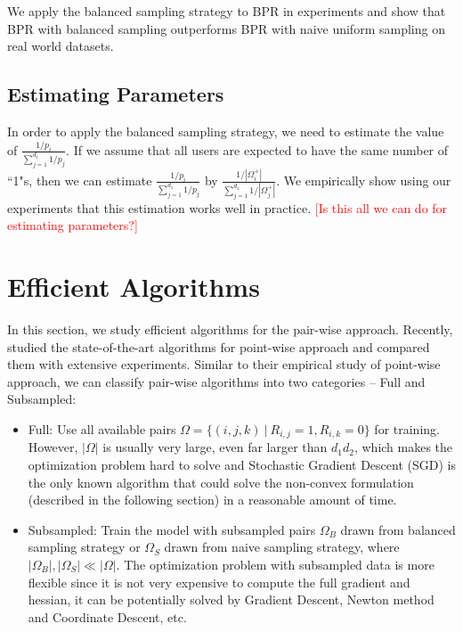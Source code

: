 \documentclass[conference]{IEEEtran}
\numberwithin{equation}{section}
\newcommand{\LL}[1]{\textcolor{red}{[#1]}}
\newtheorem{sampling strategy}{Sampling Strategy}
\begin{document}
We apply the balanced sampling strategy to BPR in experiments and show that BPR with balanced sampling outperforms BPR with naive uniform sampling on real world datasets.

\subsection{Estimating Parameters}
\label{sec:estimate}

In order to apply the balanced sampling strategy, we need to estimate the value of $\frac{1/p_i}{\sum_{j=1}^{d_1} 1/p_j}$. If we assume that all users are expected to have the same number of ``1"s, then we can estimate $\frac{1/p_i}{\sum_{j=1}^{d_1} 1/p_j}$ by $\frac{1/|\Omega_i^+|}{\sum_{j=1}^{d_1} 1/|\Omega_j^+|}$. We empirically show using our experiments that this estimation works well in practice. 
\LL{Is this all we can do for estimating parameters?}


\section{Efficient Algorithms}
\label{sec:algo}

In this section, we study efficient algorithms for the pair-wise approach. Recently, \cite{negsample} studied the state-of-the-art algorithms for point-wise approach and  compared them with extensive experiments. Similar to their empirical study of  point-wise approach, we can classify pair-wise algorithms into two  categories -- \textsf{Full} and \textsf{Subsampled}:

\begin{itemize}
    \item \textsf{Full}: Use all available pairs $\Omega = \{ (i,j,k) ~|~ R_{i,j} = 1, R_{i,k} = 0 \}$ for training. However, $|\Omega|$ is usually very large, even far larger than $d_1 d_2$, which makes the optimization problem hard to solve and Stochastic Gradient Descent (SGD) is the only known algorithm that could solve the non-convex formulation (described in the following section) in a reasonable amount of time.
    \item \textsf{Subsampled}: Train the model with subsampled pairs $\Omega_B$ drawn from balanced sampling strategy or $\Omega_S$ drawn from naive sampling strategy, where $|\Omega_B|, |\Omega_S| \ll |\Omega|$. The optimization problem with subsampled data is more flexible since it is not very expensive to compute the full gradient and hessian, it can be potentially solved by Gradient Descent, Newton method and Coordinate Descent, etc.
\end{itemize}
\end{document}
